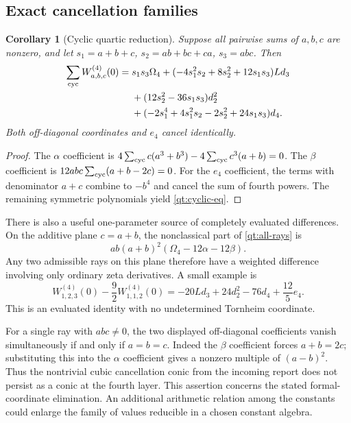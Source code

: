\documentclass[11pt]{article}
\numberwithin{equation}{section}
\newtheorem{corollary}[theorem]{Corollary}
\theoremstyle{definition}
\theoremstyle{remark}
\begin{document}
\subsection{Exact cancellation families}

\begin{corollary}[Cyclic quartic reduction]\label{qt:cyclic}
Suppose all pairwise sums of $a,b,c$ are nonzero, and let
$s_1=a+b+c$, $s_2=ab+bc+ca$, $s_3=abc$. Then
\begin{align}\label{qt:cyclic-eq}
 \sum_{\mathrm{cyc}} W_{a,b,c}^{(4)}(0)={}&s_1s_3\Omega_4
 +(-4s_1^2s_2+8s_2^2+12s_1s_3)Ld_3\notag\\
 &+(12s_2^2-36s_1s_3)d_2^2\notag\\
 &+(-2s_1^4+4s_1^2s_2-2s_2^2+24s_1s_3)d_4.
\end{align}
Both off-diagonal coordinates and $e_4$ cancel identically.
\end{corollary}
\begin{proof}
The $\alpha$ coefficient is
$4\sum_{\rm cyc}c(a^3+b^3)-4\sum_{\rm cyc}c^3(a+b)=0$.
The $\beta$ coefficient is $12abc\sum_{\rm cyc}(a+b-2c)=0$.
For the $e_4$ coefficient, the terms with denominator $a+c$
combine to $-b^4$ and cancel the sum of fourth powers. The remaining
symmetric polynomials yield \eqref{qt:cyclic-eq}.
\end{proof}

There is also a useful one-parameter source of completely evaluated
differences. On the additive plane $c=a+b$, the nonclassical part of
\eqref{qt:all-rays} is
\[
 ab(a+b)^2(\Omega_4-12\alpha-12\beta).
\]
Any two admissible rays on this plane therefore have a weighted
difference involving only ordinary zeta derivatives. A small example is
\begin{equation}\label{qt:short-difference}
 \boxed{W_{1,2,3}^{(4)}(0)-\frac92 W_{1,1,2}^{(4)}(0)
 =-20Ld_3+24d_2^2-76d_4+\frac{12}{5}e_4.}
\end{equation}
This is an evaluated identity with no undetermined Tornheim coordinate.

For a single ray with $abc\ne0$, the two displayed off-diagonal
coefficients vanish simultaneously if and only if $a=b=c$.
Indeed the $\beta$ coefficient forces $a+b=2c$; substituting this
into the $\alpha$ coefficient gives a nonzero multiple of
$(a-b)^2$. Thus the nontrivial cubic cancellation conic from the
incoming report does not persist as a conic at the fourth layer.
This assertion concerns the stated formal-coordinate elimination.
An additional arithmetic relation among the constants could enlarge
the family of values reducible in a chosen constant algebra.
\end{document}
